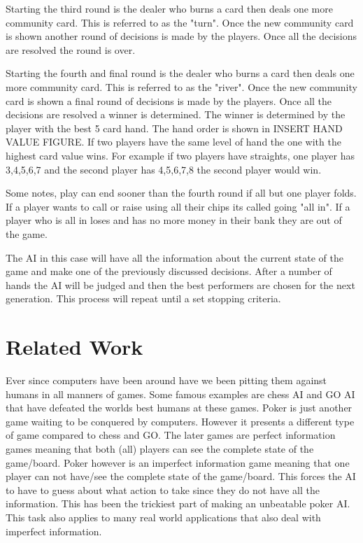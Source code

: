 Starting the third round is the dealer who burns a card then deals one more community card. This is referred to as the "turn". Once the new community card is shown another round of decisions is made by the players. Once all the decisions are resolved the round is over.

Starting the fourth and final round is the dealer who burns a card then deals one more community card. This is referred to as the "river". Once the new community card is shown a final round of decisions is made by the players. Once all the decisions are resolved a winner is determined. The winner is determined by the player with the best 5 card hand. The hand order is shown in INSERT HAND VALUE FIGURE. If two players have the same level of hand the one with the highest card value wins. For example if two players have straights, one player has 3,4,5,6,7 and the second player has 4,5,6,7,8 the second player would win.

Some notes, play can end sooner than the fourth round if all but one player folds. If a player wants to call or raise using all their chips its called going "all in". If a player who is all in loses and has no more money in their bank they are out of the game.

The AI in this case will have all the information about the current state of the game and make one of the previously discussed decisions. After a number of hands the AI will be judged and then the best performers are chosen for the next generation. This process will repeat until a set stopping criteria.


\section{Related Work}
Ever since computers have been around have we been pitting them against humans in all manners of games. Some famous examples are chess AI and GO AI that have defeated the worlds best humans at these games\cite{brown2017libratus}\cite{gilpin2005optimal}\cite{doi:10.1126/science.aay2400}. Poker is just another game waiting to be conquered by computers. However it presents a different type of game compared to chess and GO. The later games are perfect information games meaning that both (all) players can see the complete state of the game/board. Poker however is an imperfect information game meaning that one player can not have/see the complete state of the game/board\cite{brown2017libratus}\cite{davidson2000improved}\cite{gilpin2005optimal}\cite{gilpin2006competitive}\cite{doi:10.1126/science.aay2400}. This forces the AI to have to guess about what action to take since they do not have all the information. This has been the trickiest part of making an unbeatable poker AI. This task also applies to many real world applications that also deal with imperfect information.

